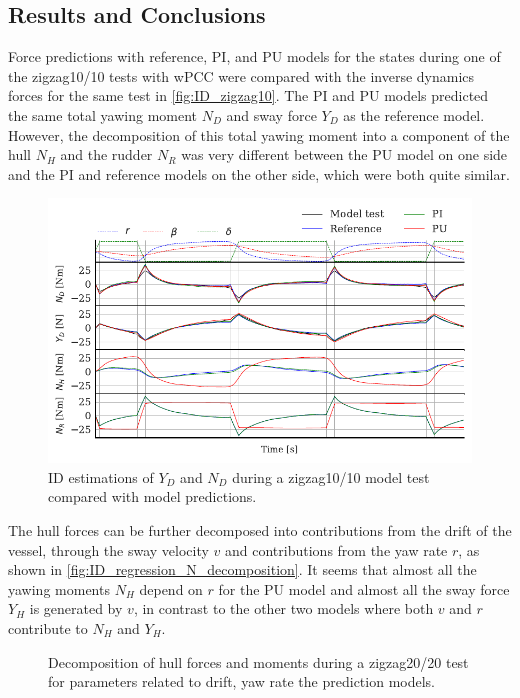 \subsection*{Results and Conclusions}
Force predictions with reference, PI, and PU models for the states during one of the zigzag10/10 tests with wPCC were compared with the inverse dynamics forces for the same test in \autoref{fig:ID_zigzag10}. The PI and PU models predicted the same total yawing moment $N_D$ and sway force $Y_D$ as the reference model. However, the decomposition of this total yawing moment into a component of the hull $N_H$ and the rudder $N_R$ was very different between the PU model on one side and the PI and reference models on the other side, which were both quite similar.
\begin{figure}[h]
    \centering
    \includegraphics{kappa/images/results.ID_zigzag10.pdf}
    \caption{ID estimations of $Y_D$ and $N_D$ during a zigzag10/10 model test compared with model predictions.}
    \label{fig:ID_zigzag10}
\end{figure}
The hull forces can be further decomposed into contributions from the drift of the vessel, through the sway velocity $v$ and contributions from the yaw rate $r$, as shown in \autoref{fig:ID_regression_N_decomposition}. It seems that almost all the yawing moments $N_H$ depend on $r$ for the PU model and almost all the sway force $Y_H$ is generated by $v$, in contrast to the other two models where both $v$ and $r$ contribute to $N_H$ and $Y_H$.
\begin{figure}[h]
    \begin{center}
        
        \caption{Decomposition of hull forces and moments during a zigzag20/20 test for parameters related to drift, yaw rate the prediction models.}
        \label{fig:ID_regression_N_decomposition}
    \end{center}
\end{figure}
